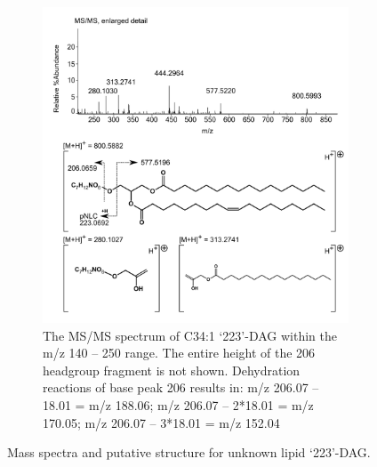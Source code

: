 {\begin{figure}[h]
\begin{subfigure}[b]{1\linewidth}
       \includegraphics[width=\linewidth]{figs_app1/223-DAG_2}
       \caption{The MS/MS spectrum of C34:1 ‘223’-DAG within the m/z 140 – 250 range. The entire height of the 206 headgroup fragment is not shown. Dehydration reactions of base peak 206 results in: m/z 206.07 – 18.01 = m/z 188.06; m/z 206.07 – 2*18.01 = m/z 170.05; m/z 206.07 – 3*18.01 = m/z 152.04}
        \label{fig:223-DAG-structure}
    \end{subfigure}
\caption{Mass spectra and putative structure for unknown lipid `223'-DAG.}
\label{fig:223-DAG}
\end{figure}
\doublespace
\clearpage
}



